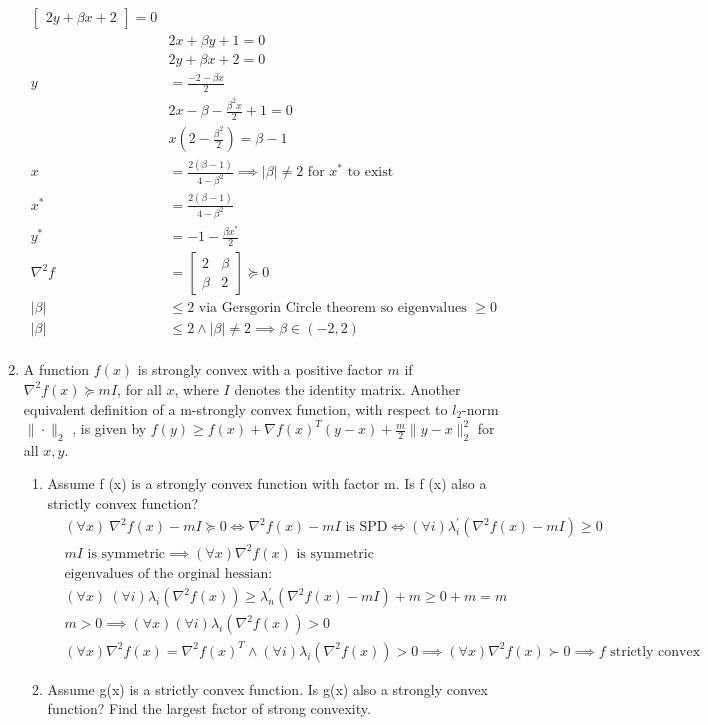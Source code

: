 \documentclass[12pt,letter]{article}
\newcommand{\norm}[1]{\|#1\|}
\begin{document}
\begin{enumerate}
\begin{align*}
\begin{bmatrix}
                 2y + \beta x +2
               \end{bmatrix} = 0\\
    &2x + \beta y + 1 = 0\\
    &2y + \beta x + 2 = 0\\
    y &= \frac{-2 - \beta x}{2}\\
    & 2x - \beta - \frac{\beta^2 x}{2} + 1 = 0\\
    & x(2-\frac{\beta^2}{2}) = \beta - 1\\
    x & = \frac{2(\beta-1)}{4-\beta^2} \implies |\beta| \neq 2 \text{ for }x^* \text{ to exist}\\
    x^* &= \frac{2(\beta-1)}{4-\beta^2}\\
    y^* &= -1 - \frac{\beta x^*}{2}\\
    \nabla^2 f & =
               \begin{bmatrix}
                 2 & \beta\\
                 \beta & 2
               \end{bmatrix} \succeq 0\\
    |\beta| & \leq 2 \text{ via Gersgorin Circle theorem so eigenvalues } \geq 0\\
    |\beta| & \leq 2 \wedge |\beta| \neq 2 \implies \beta \in (-2,2)\\
  \end{align*}
  
  \pagebreak
\item A function $f(x)$ is strongly convex with a positive factor $m$ if $\nabla^2 f(x) \succeq mI$, for all $x$, where $I$ denotes the identity matrix. Another equivalent definition of a m-strongly convex function, with respect to $l_2$-norm $\norm{\cdot}_2$ , is given by $f (y) \geq f(x)+\nabla f (x)^T (y−x) + \frac{m}{2}\norm{y-x}_2^2$ for all $x, y$.
  \begin{enumerate}
  \item Assume f (x) is a strongly convex function with factor m. Is f (x) also a strictly convex function?
    \begin{align*}
      &(\forall x)\ \nabla^2 f(x)-mI \succeq 0 \iff \nabla^2 f(x) -mI \text{ is SPD} \iff (\forall i) \lambda_i^'(\nabla^2 f(x) -mI) \geq 0\\
      &mI \text{ is symmetric} \implies (\forall x) \nabla^2 f(x) \text{ is symmetric}\\
      &\text{eigenvalues of the orginal hessian:}\\
      &(\forall x)\ (\forall i) \lambda_i(\nabla^2 f(x)) \geq \lambda_n^'(\nabla^2 f(x) -mI) + m \geq  0 + m = m\\
      &m>0 \implies (\forall x) (\forall i) \lambda_i(\nabla^2 f(x)) > 0\\
      &(\forall x) \nabla^2 f(x) = \nabla^2 f(x)^T \wedge (\forall i) \lambda_i(\nabla^2 f(x)) > 0 \implies (\forall x)\nabla^2 f(x) \succ 0 \implies f \text{ strictly convex}
    \end{align*}
  \item Assume g(x) is a strictly convex function. Is g(x) also a strongly convex function?
    Find the largest factor of strong convexity.


\end{enumerate}
\end{enumerate}
\end{document}
